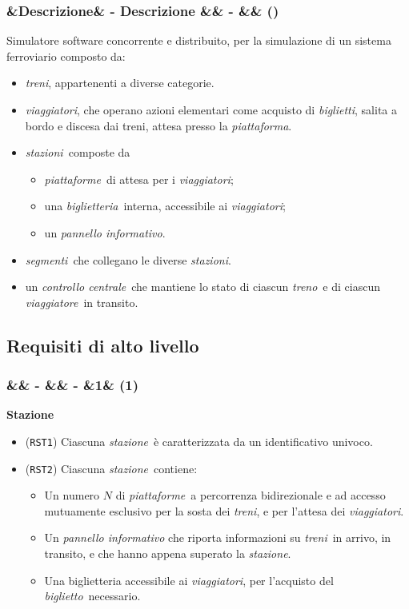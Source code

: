 \documentclass[slidestop,compress,blackandwhite]{beamer}
\newcommand{\ttt}[1]{\texttt{#1}}
\newcommand{\ii}[1]{\textit{#1}}
\newcommand{\treno}{\ii{treno}}
\newcommand{\treni}{\ii{treni}}
\newcommand{\viaggiatore}{\ii{viaggiatore}}
\newcommand{\viaggiatori}{\ii{viaggiatori}}
\newcommand{\stazione}{\ii{stazione}}
\newcommand{\stazioni}{\ii{stazioni}}
\newcommand{\piattaforma}{\ii{piattaforma}}
\newcommand{\piattaforme}{\ii{piattaforme}}
\newcommand{\ticket}{\ii{biglietto}}
\newcommand{\tickets}{\ii{biglietti}}
\newcommand{\segmenti}{\ii{segmenti}}
\newcommand{\biglietteria}{\ii{biglietteria}}
\newcommand{\controller}{\ii{controllo centrale}}
\newcommand{\newtitle}[4]{
	#1 
	\ifx&#2&%
	\else
  		\large- #2
	\fi
	\ifx&#3&%
	\else
  		\normalsize- #3
	\fi
	\ifx&#4&%
	\else
  		\normalsize (#4)
	\fi
}
\newcommand{\newframe}[5]{
	\begin{frame}
		\frametitle{\newtitle{#1}{#2}{#3}{#4}}
		#5
	\end{frame}
}
\newcommand{\itemt}[1]{\item (\ttt{#1})}
\begin{document}
	\newframe{}{Descrizione}{}{}{
		Simulatore software concorrente e distribuito, per la simulazione di un sistema ferroviario composto da:
		\begin{itemize}
			\item \treni, appartenenti a diverse categorie.
			\item \viaggiatori, che operano azioni elementari come acquisto di \tickets, salita a bordo e discesa dai treni, attesa presso la \piattaforma.
			\item \stazioni~composte da 
				\begin{itemize}
					\item \piattaforme~di attesa per i \viaggiatori;
					\item una \biglietteria~interna, accessibile ai \viaggiatori;
					\item un \ii{pannello informativo}.
				\end{itemize}
			\item \segmenti~che collegano le diverse \stazioni.
			\item un \controller~che mantiene lo stato di ciascun \treno~e di ciascun \viaggiatore~in transito.
		\end{itemize}
	}
	
	\subsection{Requisiti di alto livello}\label{requirements}
	
	\newframe{}{}{}{1}{
		
		\vspace{0.5cm}
		\textbf{Stazione}
		\begin{itemize}
			\itemt{RST1} Ciascuna \stazione~è caratterizzata da un identificativo univoco.
			\itemt{RST2} Ciascuna \stazione~contiene:
				\begin{itemize}
					\item Un numero $N$ di \piattaforme~a percorrenza bidirezionale e ad accesso mutuamente esclusivo per la sosta dei \treni, e per l'attesa dei \viaggiatori.
					\item Un \ii{pannello informativo} che riporta informazioni su \treni~in arrivo, in transito, e che hanno appena superato la \stazione.
					\item Una biglietteria accessibile ai \viaggiatori, per l'acquisto del \ticket~necessario.
				\end{itemize}
		\end{itemize} 
		
	}
	
\end{document}
